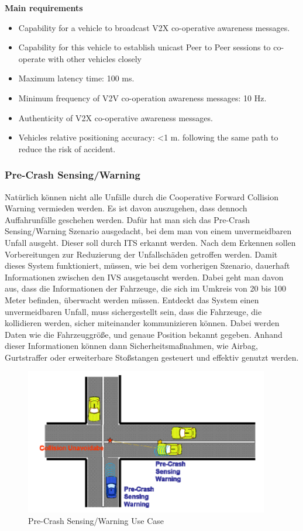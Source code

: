 \textbf{Main requirements}
\begin{itemize}
\item Capability for a vehicle to broadcast V2X co-operative awareness messages.
\item Capability for this vehicle to establish unicast Peer to Peer sessions to co-operate with other vehicles closely
\item Maximum latency time: 100 ms.
\item Minimum frequency of V2V co-operation awareness messages: 10 Hz.
\item Authenticity of V2X co-operative awareness messages.
\item Vehicles relative positioning accuracy: \textless 1 m.
following the same path to reduce the risk of accident.
\end{itemize}

\subsubsection{Pre-Crash Sensing/Warning}
Natürlich können nicht alle Unfälle durch die Cooperative Forward Collision Warning vermieden werden. Es ist davon auszugehen, dass dennoch Auffahrunfälle geschehen werden. Dafür hat man sich das Pre-Crash Sensing/Warning Szenario ausgedacht, bei dem man von einem unvermeidbaren Unfall ausgeht. Dieser soll durch \ac{ITS} erkannt werden. Nach dem Erkennen sollen Vorbereitungen zur Reduzierung der Unfallschäden getroffen werden. Damit dieses System funktioniert, müssen, wie bei dem vorherigen Szenario, dauerhaft Informationen zwischen den \ac{IVS} ausgetauscht werden. Dabei geht man davon aus, dass die Informationen der Fahrzeuge, die sich im Umkreis von 20 bis 100 Meter befinden, überwacht werden müssen. Entdeckt das System einen unvermeidbaren Unfall, muss sichergestellt sein, dass die Fahrzeuge, die kollidieren werden, sicher miteinander kommunizieren können. Dabei werden Daten wie die Fahrzeuggröße, und genaue Position bekannt gegeben. Anhand dieser Informationen können dann Sicherheitsmaßnahmen, wie Airbag, Gurtstraffer oder erweiterbare Stoßstangen gesteuert und effektiv genutzt werden. 

\begin{figure}[htbp]
	\includegraphics[width=0.95\textwidth]{content/images/06_use_cases/pre_crash_sensing.png}
	\caption{Pre-Crash Sensing/Warning Use Case \cite{etsi102638}}
	\label{fig:pcs}
\end{figure}

